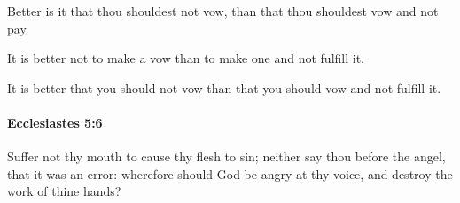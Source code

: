 			\begin{versebox}
					\item[BHS] 
					\item[LXX] 
					\item[ASV] Better is it that thou shouldest not vow, than that thou shouldest vow and not pay.
					\item[NIV] It is better not to make a vow than to make one and not fulfill it.
					\item[NRSV] It is better that you should not vow than that you should vow and not fulfill it.
			\end{versebox}

		\paragraph{Ecclesiastes 5:6} %
			\label{ECCLESIASTES-5-6}

			Suffer not thy mouth to cause thy flesh to sin; neither say thou before the angel, that it was an error: wherefore should God be angry at thy voice, and destroy the work of thine hands?


